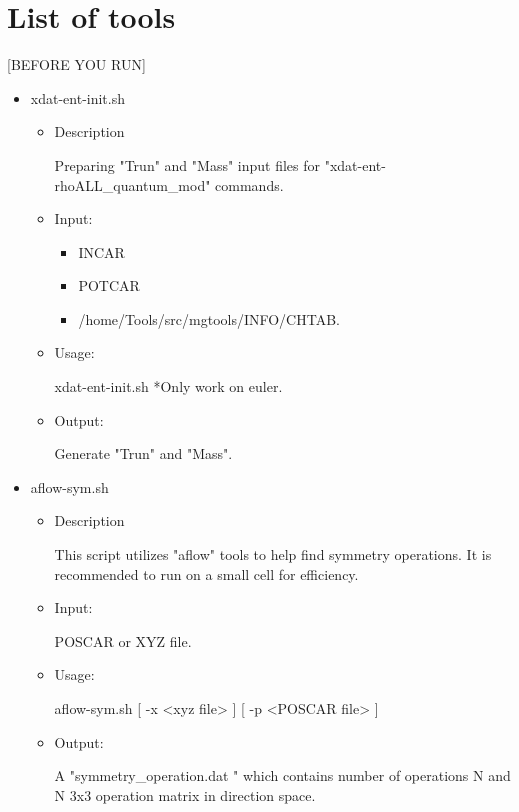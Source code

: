 \documentclass[11pt]{article}
\begin{document}
\section{List of tools}
\label{sec:org1e91d21}
[BEFORE YOU RUN]
\begin{itemize}
\item xdat-ent-init.sh

\begin{itemize}
\item Description

Preparing "Trun" and "Mass" input files for "xdat-ent-rhoALL\_quantum\_mod"
commands.

\item Input:
\begin{itemize}
\item INCAR
\item POTCAR
\item /home/Tools/src/mgtools/INFO/CHTAB.
\end{itemize}

\item Usage:

xdat-ent-init.sh
*Only work on euler.

\item Output:

Generate "Trun" and "Mass".
\end{itemize}

\item aflow-sym.sh
\begin{itemize}
\item Description

This script utilizes "aflow" tools to help find symmetry operations. It is recommended to
run on a small cell for efficiency.

\item Input:

POSCAR or XYZ file.

\item Usage:

aflow-sym.sh [ -x <xyz file> ] [ -p <POSCAR file> ]

\item Output:

A "symmetry\_operation.dat " which contains number of operations N and N
3x3 operation matrix in direction space.
\end{itemize}
\end{itemize}
\end{document}
